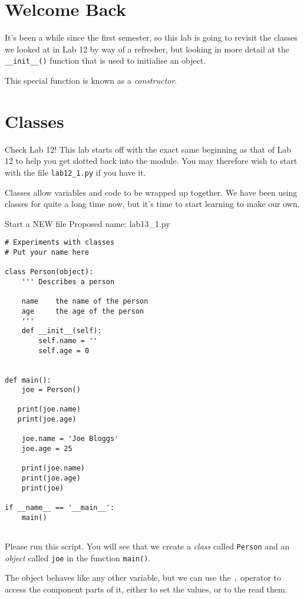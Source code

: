 \documentclass[12pt,oneside]{cttutorial}
\begin{document}
\section{Welcome Back}

It's been a while since the first semester, so this lab is going to revisit the classes we looked at in Lab 12 by way of a refresher, but looking in more detail at the \lstinline!__init__()! function that is used to initialise an object.

This special function is known as a \emph{constructor}.

\section{Classes}

\alert{Check Lab 12!}
This lab starts off with the exact same beginning as that of Lab 12 to help you get slotted back into the module. You may therefore wish to start with the file \lstinline!lab12_1.py! if you have it.


Classes allow variables and code to be wrapped up together. We have been using classes for quite a long time now, but it's time to start learning to make our own.

\alert{Start a NEW file}
Proposed name: lab13\_1.py
\begin{lstlisting}
# Experiments with classes
# Put your name here

class Person(object):
    ''' Describes a person

    name    the name of the person
    age     the age of the person
    '''
    def __init__(self):
        self.name = ''
        self.age = 0


def main():
    joe = Person()

   print(joe.name)
   print(joe.age)
   
    joe.name = 'Joe Bloggs'
    joe.age = 25

    print(joe.name)
    print(joe.age)
    print(joe)

if __name__ == '__main__':
    main()
    
\end{lstlisting}

Please run this script. You will see that we create a \emph{class} called \lstinline!Person! and an \emph{object} called \lstinline!joe! in the function \lstinline!main()!.

The object behaves like any other variable, but we can use the \lstinline!.! operator to access the component parts of it, either to set the values, or to the read them.
\end{document}
